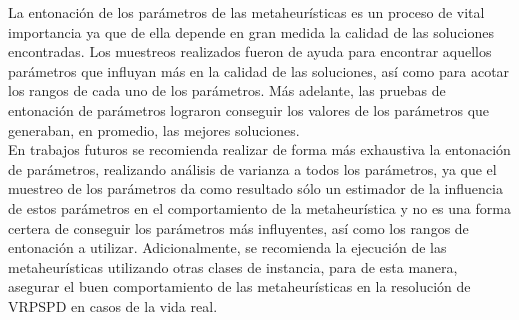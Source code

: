 La entonación de los parámetros de las metaheurísticas es un proceso de vital importancia ya que de ella depende en gran medida la calidad de las soluciones encontradas. Los muestreos realizados fueron de ayuda para encontrar aquellos parámetros que influyan más en la calidad de las soluciones, así como para acotar los rangos de cada uno de los parámetros. Más adelante, las pruebas de entonación de parámetros lograron conseguir los valores de los parámetros que generaban, en promedio, las mejores soluciones.\\

En trabajos futuros se recomienda realizar de forma más exhaustiva la entonación de parámetros, realizando análisis de varianza a todos los parámetros, ya que el muestreo de los parámetros da como resultado sólo un estimador de la influencia de estos parámetros en el comportamiento de la metaheurística y no es una forma certera de conseguir los parámetros más influyentes, así como los rangos de entonación a utilizar. Adicionalmente, se recomienda la ejecución de las metaheurísticas utilizando otras clases de instancia, para de esta manera, asegurar el buen comportamiento de las metaheurísticas en la resolución de VRPSPD en casos de la vida real.